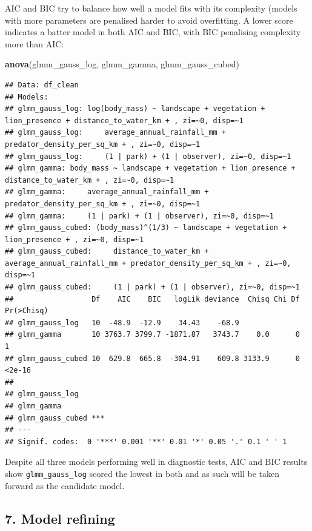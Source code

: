 \documentclass[
]{article}
\newenvironment{Shaded}{\begin{snugshade}}{\end{snugshade}}
\newcommand{\FunctionTok}[1]{\textcolor[rgb]{0.13,0.29,0.53}{\textbf{#1}}}
\newcommand{\NormalTok}[1]{#1}
\begin{document}
AIC and BIC try to balance how well a model fits with its complexity
(models with more parameters are penalised harder to avoid overfitting.
A lower score indicates a batter model in both AIC and BIC, with BIC
penalising complexity more than AIC:

\begin{Shaded}
\begin{Highlighting}[]
\FunctionTok{anova}\NormalTok{(glmm\_gauss\_log, glmm\_gamma, glmm\_gauss\_cubed)}
\end{Highlighting}
\end{Shaded}

\begin{verbatim}
## Data: df_clean
## Models:
## glmm_gauss_log: log(body_mass) ~ landscape + vegetation + lion_presence + distance_to_water_km + , zi=~0, disp=~1
## glmm_gauss_log:     average_annual_rainfall_mm + predator_density_per_sq_km + , zi=~0, disp=~1
## glmm_gauss_log:     (1 | park) + (1 | observer), zi=~0, disp=~1
## glmm_gamma: body_mass ~ landscape + vegetation + lion_presence + distance_to_water_km + , zi=~0, disp=~1
## glmm_gamma:     average_annual_rainfall_mm + predator_density_per_sq_km + , zi=~0, disp=~1
## glmm_gamma:     (1 | park) + (1 | observer), zi=~0, disp=~1
## glmm_gauss_cubed: (body_mass)^(1/3) ~ landscape + vegetation + lion_presence + , zi=~0, disp=~1
## glmm_gauss_cubed:     distance_to_water_km + average_annual_rainfall_mm + predator_density_per_sq_km + , zi=~0, disp=~1
## glmm_gauss_cubed:     (1 | park) + (1 | observer), zi=~0, disp=~1
##                  Df    AIC    BIC   logLik deviance  Chisq Chi Df Pr(>Chisq)
## glmm_gauss_log   10  -48.9  -12.9    34.43    -68.9                         
## glmm_gamma       10 3763.7 3799.7 -1871.87   3743.7    0.0      0          1
## glmm_gauss_cubed 10  629.8  665.8  -304.91    609.8 3133.9      0     <2e-16
##                     
## glmm_gauss_log      
## glmm_gamma          
## glmm_gauss_cubed ***
## ---
## Signif. codes:  0 '***' 0.001 '**' 0.01 '*' 0.05 '.' 0.1 ' ' 1
\end{verbatim}

Despite all three models performing well in diagnostic tests, AIC and
BIC results show \texttt{glmm\_gauss\_log} scored the lowest in both and
as such will be taken forward as the candidate model.

\subsection{7. Model refining}\label{model-refining}
\end{document}
